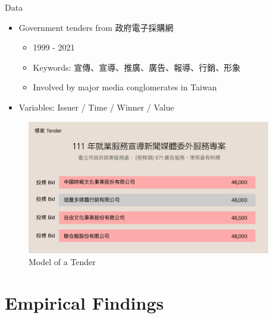 \documentclass[
  10pt,
  ignorenonframetext,
  aspectratio=169,
]{beamer}
\providecommand{\tightlist}{%
  \setlength{\itemsep}{0pt}\setlength{\parskip}{0pt}}
\begin{document}
\begin{frame}{Data}
\begin{itemize}
\tightlist
\item
  Government tenders from 政府電子採購網

  \begin{itemize}
  \tightlist
  \item
    1999 - 2021
  \item
    Keywords: 宣傳、宣導、推廣、廣告、報導、行銷、形象
  \item
    Involved by major media conglomerates in Taiwan
  \end{itemize}
\item
  Variables: Issuer / Time / Winner / Value
\end{itemize}
\end{frame}

\begin{frame}
\begin{figure}
\centering
\includegraphics[width=0.95\textwidth,height=\textheight]{./graphs/tender-model.png}
\caption{Model of a Tender}
\end{figure}
\end{frame}

\begin{frame}

\end{frame}

\hypertarget{empirical-findings}{%
\section{Empirical Findings}\label{empirical-findings}}
\end{document}

